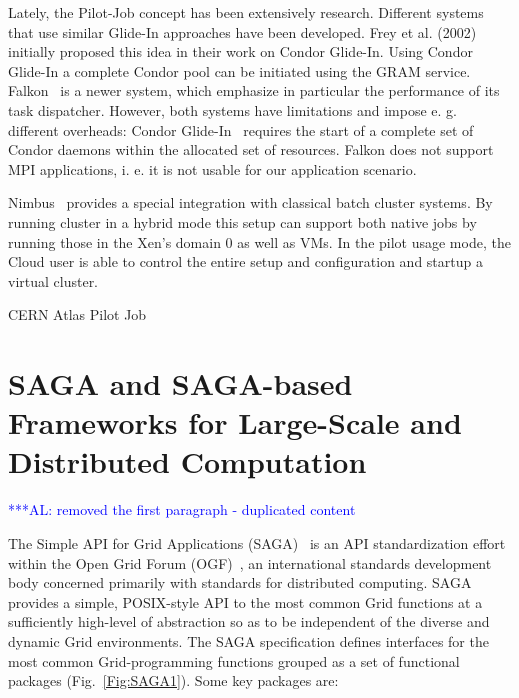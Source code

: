 \documentclass[conference,final]{IEEEtran}
\newcommand{\alnote}[1]{ {\textcolor{blue} { ***AL: #1 }}}
\newcommand{\alnote}[1]{}
\begin{document}

Lately, the Pilot-Job concept has been extensively research.
Different systems that use similar Glide-In approaches have been
developed. Frey et al. (2002) initially proposed this idea in their
work on Condor Glide-In. Using Condor Glide-In a complete Condor pool
can be initiated using the GRAM service. Falkon~\cite{1362680} is a
newer system, which emphasize in particular the performance of its
task dispatcher. However, both systems have limitations and impose
e. g. different overheads: Condor Glide-In~\cite{citeulike:291860}
requires the start of a complete set of Condor daemons within the
allocated set of resources. Falkon does not support MPI applications,
i. e. it is not usable for our application scenario.

Nimbus~\cite{10.1109/MIC.2009.94} provides a special integration with
classical batch cluster systems. By running cluster in a hybrid mode
this setup can support both native jobs by running those in the Xen's
domain 0 as well as VMs. In the pilot usage mode, the Cloud user is
able to control the entire setup and configuration and startup a
virtual cluster.

CERN Atlas Pilot Job~\cite{1555338}

\section{SAGA and SAGA-based Frameworks for Large-Scale and Distributed Computation}

\alnote{removed the first paragraph - duplicated content}

The Simple API for Grid Applications (SAGA)~\cite{saga_url}  is an API standardization
effort within the Open Grid Forum (OGF)~\cite{saga_gfd90}, an
international standards development body concerned primarily with
standards for distributed computing. SAGA provides a simple,
POSIX-style API to the most common Grid functions at a sufficiently
high-level of abstraction so as to be independent of the diverse and
dynamic Grid environments. The SAGA specification defines interfaces
for the most common Grid-programming functions grouped as a set of
functional packages (Fig.~\ref{Fig:SAGA1}). Some key packages are:
\end{document}
